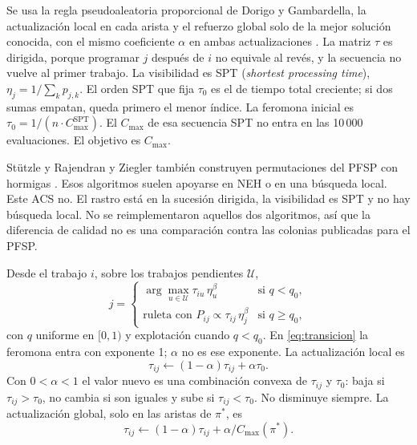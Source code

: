 \documentclass[journal]{IEEEtran}
\begin{document}
Se usa la regla pseudoaleatoria proporcional de Dorigo y Gambardella, la actualización local en cada arista y el refuerzo global solo de la mejor solución conocida, con el mismo coeficiente $\alpha$ en ambas actualizaciones \cite{dorigo_ant_1997}. La matriz $\tau$ es dirigida, porque programar $j$ después de $i$ no equivale al revés, y la secuencia no vuelve al primer trabajo. La visibilidad es SPT (\textit{shortest processing time}), $\eta_j=1/\sum_k p_{j,k}$. El orden SPT que fija $\tau_0$ es el de tiempo total creciente; si dos sumas empatan, queda primero el menor índice. La feromona inicial es $\tau_0=1/(n\cdot C_{\max}^{\mathrm{SPT}})$. El $C_{\max}$ de esa secuencia SPT no entra en las 10\,000 evaluaciones. El objetivo es $C_{\max}$.

Stützle y Rajendran y Ziegler también construyen permutaciones del PFSP con hormigas \cite{stutzle_ant_1998,rajendran_ant-colony_2004}. Esos algoritmos suelen apoyarse en NEH o en una búsqueda local. Este ACS no. El rastro está en la sucesión dirigida, la visibilidad es SPT y no hay búsqueda local. No se reimplementaron aquellos dos algoritmos, así que la diferencia de calidad no es una comparación contra las colonias publicadas para el PFSP.

Desde el trabajo $i$, sobre los trabajos pendientes $\mathcal{U}$,
\begin{equation}
  j=
  \begin{cases}
    \arg\max_{u\in\mathcal{U}}\tau_{iu}\,\eta_u^{\beta} & \text{si } q<q_0,\\[4pt]
    \text{ruleta con } P_{ij}\propto \tau_{ij}\,\eta_j^{\beta} & \text{si } q\ge q_0,
  \end{cases}\label{eq:transicion}
\end{equation}
con $q$ uniforme en $[0,1)$ y explotación cuando $q<q_0$. En \eqref{eq:transicion} la feromona entra con exponente 1; $\alpha$ no es ese exponente. La actualización local es
\begin{equation}\tau_{ij}\leftarrow(1-\alpha)\tau_{ij}+\alpha\tau_0.\label{eq:local}\end{equation} Con $0<\alpha<1$ el valor nuevo es una combinación convexa de $\tau_{ij}$ y $\tau_0$: baja si $\tau_{ij}>\tau_0$, no cambia si son iguales y sube si $\tau_{ij}<\tau_0$. No disminuye siempre. La actualización global, solo en las aristas de $\pi^{*}$, es
\begin{equation}\tau_{ij}\leftarrow(1-\alpha)\tau_{ij}+\alpha/C_{\max}(\pi^{*}).\label{eq:global}\end{equation}
\end{document}
